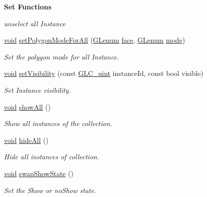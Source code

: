 \begin{Indent}{\bf Set Functions}
\begin{DoxyCompactItemize}
\begin{DoxyCompactList}\small\item\em unselect all Instance \end{DoxyCompactList}\item 
\hyperlink{group___u_a_v_objects_plugin_ga444cf2ff3f0ecbe028adce838d373f5c}{void} \hyperlink{class_g_l_c__3_d_view_collection_ad04850e0a4d3e6e96621413a39c32333}{set\-Polygon\-Mode\-For\-All} (\hyperlink{glext_8h_a508b2dec21679e2e346cad3e0d1969bf}{G\-Lenum} \hyperlink{glext_8h_a676ca580c460c0154eb58200433d2a9e}{face}, \hyperlink{glext_8h_a508b2dec21679e2e346cad3e0d1969bf}{G\-Lenum} \hyperlink{glext_8h_a1e71d9c196e4683cc06c4b54d53f7ef5}{mode})
\begin{DoxyCompactList}\small\item\em Set the polygon mode for all Instance. \end{DoxyCompactList}\item 
\hyperlink{group___u_a_v_objects_plugin_ga444cf2ff3f0ecbe028adce838d373f5c}{void} \hyperlink{class_g_l_c__3_d_view_collection_a516e46fb65eb88765571d2ca239c4033}{set\-Visibility} (const \hyperlink{glc__global_8h_abf950976fabed69026558df8e2da6c6b}{G\-L\-C\-\_\-uint} instance\-Id, const bool visible)
\begin{DoxyCompactList}\small\item\em Set Instance visibility. \end{DoxyCompactList}\item 
\hyperlink{group___u_a_v_objects_plugin_ga444cf2ff3f0ecbe028adce838d373f5c}{void} \hyperlink{class_g_l_c__3_d_view_collection_afc62038ac3a8c07a586b9c97c786d985}{show\-All} ()
\begin{DoxyCompactList}\small\item\em Show all instances of the collection. \end{DoxyCompactList}\item 
\hyperlink{group___u_a_v_objects_plugin_ga444cf2ff3f0ecbe028adce838d373f5c}{void} \hyperlink{class_g_l_c__3_d_view_collection_af421123bee1a3220b4d2452c5e4dfc3a}{hide\-All} ()
\begin{DoxyCompactList}\small\item\em Hide all instances of collection. \end{DoxyCompactList}\item 
\hyperlink{group___u_a_v_objects_plugin_ga444cf2ff3f0ecbe028adce838d373f5c}{void} \hyperlink{class_g_l_c__3_d_view_collection_a035f37fe2c66e8d1089e19f2615e6b7e}{swap\-Show\-State} ()
\begin{DoxyCompactList}\small\item\em Set the Show or no\-Show state. \end{DoxyCompactList}\item 

\end{DoxyCompactItemize}
\end{Indent}

